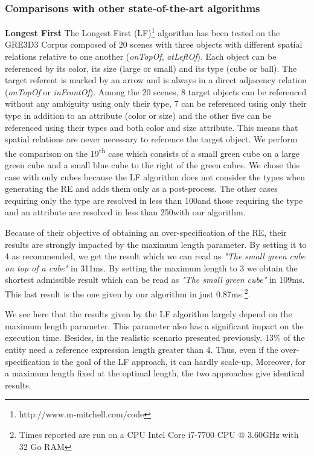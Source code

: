 \documentclass[a4paper,11pt,twoside]{StyleThese}
\begin{document}
\subsubsection{Comparisons with other state-of-the-art algorithms}

\textbf{Longest First} The Longest First (LF)\footnote{http://www.m-mitchell.com/code} algorithm \cite{viethen2013graphs} has been tested on the GRE3D3 Corpus composed of 20 scenes with three objects with different spatial relations relative to one another (\textit{onTopOf}, \textit{atLeftOf}). Each object can be referenced by its color, its size (large or small) and its type (cube or ball). The target referent is marked by an arrow and is always in a direct adjacency relation (\textit{onTopOf} or \textit{inFrontOf}).
Among the 20 scenes, 8 target objects can be referenced without any ambiguity using only their type, 7 can be referenced using only their type in addition to an attribute (color or size) and the other five can be referenced using their types and both color and size attribute. This means that spatial relations are never necessary to reference the target object. 
We perform the comparison on the 19\textsuperscript{th} case which consists of a small green cube on a large green cube and a small blue cube to the right of the green cubes. We chose this case with only cubes because the LF algorithm does not consider the types when generating the RE and adds them only as a post-process. The other cases requiring only the type are resolved in less than 100\us and those requiring the type and an attribute are resolved in less than 250\us with our algorithm.

Because of their objective of obtaining an over-specification of the RE, their results are strongly impacted by the maximum length parameter. By setting it to 4 as recommended, we get the result which we can read as \textit{"The small green cube on top of a cube"} in 311ms. By setting the maximum length to 3 we obtain the shortest admissible result which can be read as \textit{"The small green cube"} in 109ms. This last result is the one given by our algorithm in just 0.87ms \footnote{Times reported are run on a CPU Intel Core i7-7700 CPU @ 3.60GHz with 32 Go RAM}.

We see here that the results given by the LF algorithm largely depend on the maximum length parameter. This parameter also has a significant impact on the execution time. Besides, in the realistic scenario presented previously, 13\% of the entity need a reference expression length greater than 4. Thus, even if the over-specification is the goal of the LF approach, it can hardly scale-up. Moreover, for a maximum length fixed at the optimal length, the two approaches give identical results.
\end{document}
